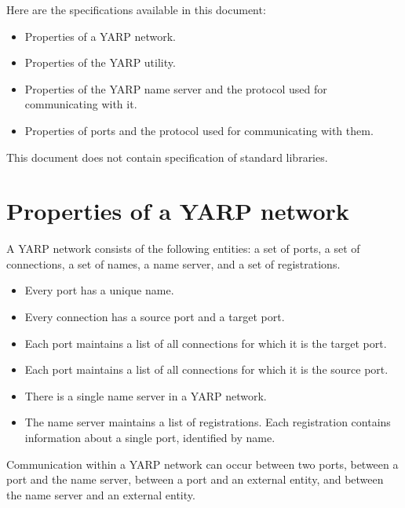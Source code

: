 Here are the specifications available in this document:
%
\begin{itemize} \pflist

\item Properties of a YARP network.

\item Properties of the YARP utility.

\item Properties of the YARP name server and the protocol used 
for communicating with it.

\item Properties of ports and the protocol used
for communicating with them.

\end{itemize}

\noindent
This document does not contain specification of standard libraries.



\section{Properties of a YARP network}

A YARP network consists of the following entities: a set of
ports, a set of connections, a set of names, a name server, and a set
of registrations.

\begin{itemize} \pflist

\item Every port has a unique name.

\item Every connection has a source port and a target port.

\item Each port maintains a list of all connections for which it
is the target port.

\item Each port maintains a list of all connections for which it
is the source port.

\item There is a single name server in a YARP network.

\item The name server maintains a list of registrations.  Each 
registration contains information about a single port, identified
by name.

\end{itemize}


\noindent
Communication within a YARP network can occur between two ports,
between a port and the name server, between a port and an
external entity, and between the name server and an external entity.


